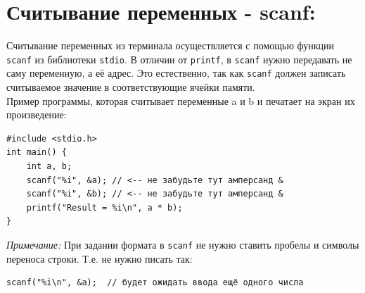 \documentclass{article}
\begin{document}
\newpage
\section*{Считывание переменных - scanf:}
Считывание переменных из терминала осуществляется с помощью функции \texttt{scanf} из библиотеки \texttt{stdio}. В отличии от \texttt{printf}, в \texttt{scanf} нужно передавать не саму переменную, а её адрес. Это естественно, так как \texttt{scanf} должен записать считываемое значение в соответствующие ячейки памяти.\\
Пример программы, которая считывает переменные a и b и печатает на экран их произведение:
\begin{lstlisting}
#include <stdio.h>
int main() {
    int a, b;
    scanf("%i", &a); // <-- не забудьте тут амперсанд &
    scanf("%i", &b); // <-- не забудьте тут амперсанд &
    printf("Result = %i\n", a * b);
}
\end{lstlisting}
\textit{Примечание:} При задании формата в \texttt{scanf} не нужно ставить пробелы и символы переноса строки. Т.е. не нужно писать так:
\begin{lstlisting}
scanf("%i\n", &a);  // будет ожидать ввода ещё одного числа
\end{lstlisting}
\end{document}
